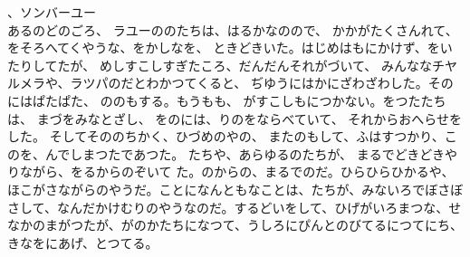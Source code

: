 \documentclass[
a4paper,
fontsize=20pt,
jafontsize=20pt,
book]
{tarticle}
\begin{document}
、ソンバーユー\\

あるのどのごろ、
ラユーののたちは、はるかなのので、
かかがたくさんれて、をそろへてくやうな、をかしなを、
ときどきいた。はじめはもにかけず、をいたりしてたが、
めしすこしすぎたころ、だんだんそれがづいて、
みんななチヤルメラや、ラツパのだとわかつてくると、
ぢゆうにはかにざわざわした。そのにはぱたぱた、
ののもする。もうもも、
がすこしもにつかない。をつたたちは、
まづをみなとざし、
をのには、りのをならべていて、
それからおへらせをした。
そしてそののちかく、ひづめのやの、
またのもして、ふはすつかり、このを、んでしまつたであつた。
たちや、あらゆるのたちが、
まるでどきどきやりながら、をるからのぞいて
た。のからの、まるでのだ。ひらひらひかるや、ほこがさながらのやうだ。ことになんともなことは、たちが、みないろでぼさぼさして、なんだかけむりのやうなのだ。するどいをして、ひげがいろまつな、せなかのまがつたが、がのかたちになつて、うしろにぴんとのびてるにつてにち、きなをにあげ、とつてる。
\end{document}
